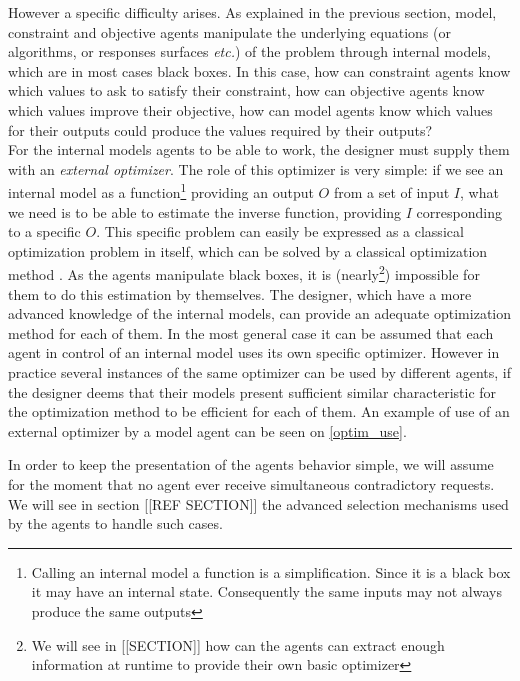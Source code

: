 However a specific difficulty arises. As explained in the previous section, model, constraint and objective agents manipulate the underlying equations (or algorithms, or responses surfaces \emph{etc.}) of the problem through internal models, which are in most cases black boxes. In this case, how can constraint agents know which values to ask to satisfy their constraint, how can objective agents know which values improve their objective, how can model agents know which values for their outputs could produce the values required by their outputs?\\
For the internal models agents to be able to work, the designer must supply them with an \emph{external optimizer}. The role of this optimizer is very simple: if we see an internal model as a function\footnote{Calling an internal model a function is a simplification. Since it is a black box it may have an internal state. Consequently the same inputs may not always produce the same outputs} providing an output $O$ from a set of input $I$, what we need is to be able to estimate the inverse function, providing $I$ corresponding to a specific $O$. This specific problem can easily be expressed as a classical optimization problem in itself, which can be solved by a classical optimization method . As the agents manipulate black boxes, it is (nearly\footnote{We will see in [[SECTION]] how can the agents can extract enough information at runtime to provide their own basic optimizer}) impossible for them to do this estimation by themselves. The designer, which have a more advanced knowledge of the internal models, can provide an adequate optimization method for each of them. In the most general case it can be assumed that each agent in control of an internal model uses its own specific optimizer. However in practice several instances of the same optimizer can be used by different agents, if the designer deems that their models present sufficient similar characteristic for the optimization method to be efficient for each of them. An example of use of an external optimizer by a model agent can be seen on \figurename{} \ref{optim_use}.

In order to keep the presentation of the agents behavior simple, we will assume for the moment that no agent ever receive simultaneous contradictory requests. We will see in section [[REF SECTION]] the advanced selection mechanisms used by the agents to handle such cases.

